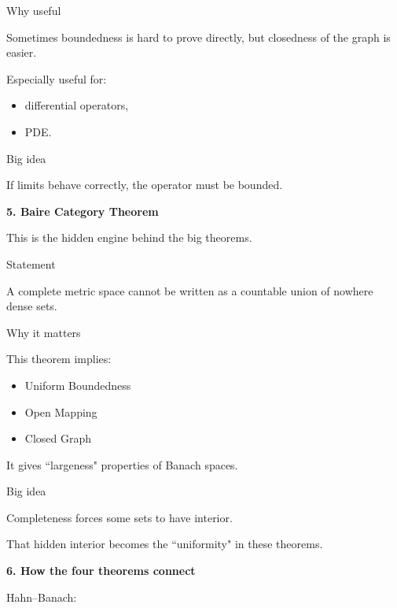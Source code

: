 \documentclass[12pt,a4paper]{report}
\begin{document}
\begin{description}
\begin{description}
    \item Why useful

Sometimes boundedness is hard to prove directly, but closedness of the graph is easier.

Especially useful for:
	\begin{itemize}
    \item differential operators,
    \item PDE.
	\end{itemize}

    \item Big idea

\> If limits behave correctly, the operator must be bounded.

	\end{description}

\item \textbf{5. Baire Category Theorem}

This is the hidden engine behind the big theorems.

	\begin{description}
    \item Statement

A complete metric space cannot be written as a countable union of nowhere dense sets.

    \item Why it matters

This theorem implies:

	\begin{itemize}
    \item Uniform Boundedness
    \item Open Mapping
    \item Closed Graph
	\end{itemize}

It gives ``largeness" properties of Banach spaces.

    \item Big idea

\> Completeness forces some sets to have interior.

That hidden interior becomes the ``uniformity" in these theorems.
	\end{description}

\item \textbf{6. How the four theorems connect}

	\begin{description}
    \item Hahn–Banach:


\end{description}
\end{description}
\end{document}
